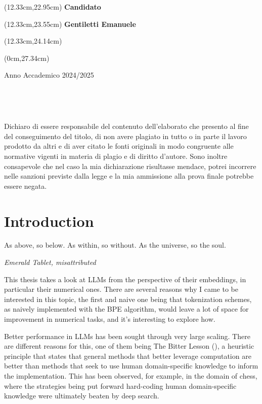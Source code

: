 \documentclass[
  a4paper, twoside, 10pt, titlepage]{book}
\begin{document}
\begin{textblock*}{8cm}(12.33cm,22.95cm)
	\noindent
	\textbf{Candidato}
\end{textblock*}
\begin{textblock*}{8cm}(12.33cm,23.55cm)
	\noindent	\textbf{Gentiletti Emanuele}
\end{textblock*}
\begin{textblock*}{8cm}(12.33cm,24.14cm)
\end{textblock*}

\begin{textblock*}{21cm}(0cm,27.34cm)
	\centerline{Anno Accademico 2024/2025}
\end{textblock*}

\endgroup

\newpage
$ $

\newpage
$ $

Dichiaro di essere responsabile del contenuto dell’elaborato che presento al fine
del conseguimento del titolo, di non avere plagiato in tutto o in parte il lavoro
prodotto da altri e di aver citato le fonti originali in modo congruente alle normative
vigenti in materia di plagio e di diritto d’autore. Sono inoltre consapevole che nel
caso la mia dichiarazione risultasse mendace, potrei incorrere nelle sanzioni previste
dalla legge e la mia ammissione alla prova finale potrebbe essere negata.

\newpage

{
\setcounter{tocdepth}{2}
\tableofcontents
}
\mainmatter
\chapter{Introduction}\label{introduction}

\epigraph{As above, so below. As within, so without. As the universe, so the
soul.}{\textit{Emerald Tablet, misattributed}}

This thesis takes a look at LLMs from the perspective of their
embeddings, in particular their numerical ones. There are several
reasons why I came to be interested in this topic, the first and naive
one being that tokenization schemes, as naively implemented with the BPE
algorithm, would leave a lot of space for improvement in numerical
tasks, and it's interesting to explore how.

Better performance in LLMs has been sought through very large scaling.
There are different reasons for this, one of them being The Bitter
Lesson (), a heuristic
principle that states that general methods that better leverage
computation are better than methods that seek to use human
domain-specific knowledge to inform the implementation. This has been
observed, for example, in the domain of chess, where the strategies
being put forward hard-coding human domain-specific knowledge were
ultimately beaten by deep search.
\end{document}
